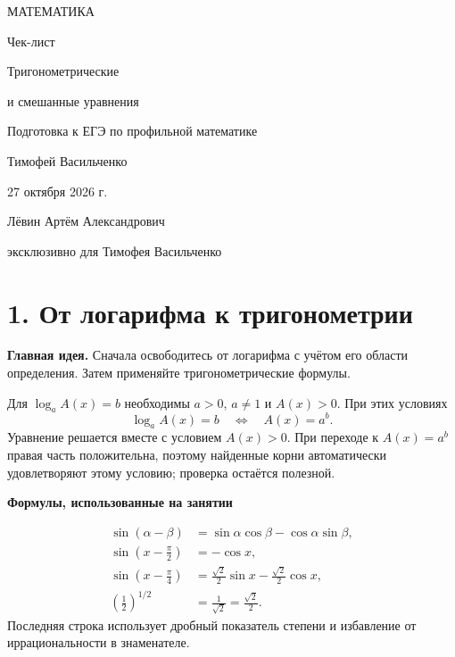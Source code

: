 \documentclass[a4paper,12pt]{article}
\newcommand{\key}[1]{\textcolor{darkaccent}{\textbf{#1}}}
\newcommand{\sub}[1]{\vspace{.45em}\noindent\textcolor{darkaccent}{\bfseries #1}\par\smallskip}
\newcommand{\sect}[1]{\section*{\color{darkaccent}#1}}
\begin{document}
\thispagestyle{empty}
\begin{center}
\vspace*{18mm}
{\large\textcolor{darkaccent}{МАТЕМАТИКА}}\par
\vspace{18mm}
{\fontsize{23}{29}\selectfont Чек-лист}\par
\vspace{12mm}
{\fontsize{20}{25}\selectfont\textcolor{accent}{Тригонометрические}}\par
{\fontsize{20}{25}\selectfont\textcolor{accent}{и смешанные уравнения}}\par
\vspace{17mm}
{\large Подготовка к ЕГЭ по профильной математике}\par
\vfill
{\large Тимофей Васильченко}\par
\vspace{7mm}
{\large 27 октября 2026 г.}\par
\vspace{20mm}
{\small Лёвин Артём Александрович}\par
{\small эксклюзивно для Тимофея Васильченко}\par
\vspace{18mm}
\end{center}
\clearpage

\sect{1. От логарифма к тригонометрии}
\key{Главная идея.} Сначала освободитесь от логарифма с учётом его области определения. Затем применяйте тригонометрические формулы.

Для $\log_a A(x)=b$ необходимы $a>0$, $a\ne1$ и $A(x)>0$. При этих условиях
\[
\log_a A(x)=b\quad\Longleftrightarrow\quad A(x)=a^b.
\]
Уравнение решается вместе с условием $A(x)>0$. При переходе к $A(x)=a^b$ правая часть положительна, поэтому найденные корни автоматически удовлетворяют этому условию; проверка остаётся полезной.

\sub{Формулы, использованные на занятии}
\[
\begin{aligned}
\sin(\alpha-\beta)&=\sin\alpha\cos\beta-\cos\alpha\sin\beta,\\
\sin\left(x-\frac\pi2\right)&=-\cos x,\\
\sin\left(x-\frac\pi4\right)&=\frac{\sqrt2}{2}\sin x-\frac{\sqrt2}{2}\cos x,\\
\left(\frac12\right)^{1/2}&=\frac1{\sqrt2}=\frac{\sqrt2}{2}.
\end{aligned}
\]
Последняя строка использует дробный показатель степени и избавление от иррациональности в знаменателе.
\end{document}
